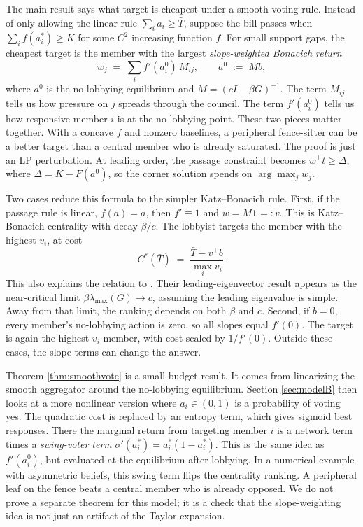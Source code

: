 \documentclass[11pt,letterpaper]{article}
\theoremstyle{plain}
\theoremstyle{definition}
\theoremstyle{remark}
\begin{document}
The main result says what target is cheapest under a smooth voting rule. Instead of only allowing the linear rule $\sum_i a_i \geq \bar T$, suppose the bill passes when $\sum_i f(a_i^*) \geq K$ for some $C^2$ increasing function $f$. For small support gaps, the cheapest target is the member with the largest \emph{slope-weighted Bonacich return}
\[
w_j \;=\; \sum_i f'(a_i^0)\, M_{ij}, \qquad a^0 \;:=\; M b,
\]
where $a^0$ is the no-lobbying equilibrium and $M = (cI - \beta G)^{-1}$. The term $M_{ij}$ tells us how pressure on $j$ spreads through the council. The term $f'(a_i^0)$ tells us how responsive member $i$ is at the no-lobbying point. These two pieces matter together. With a concave $f$ and nonzero baselines, a peripheral fence-sitter can be a better target than a central member who is already saturated. The proof is just an LP perturbation. At leading order, the passage constraint becomes $w^\top t \geq \Delta$, where $\Delta = K - F(a^0)$, so the corner solution spends on $\arg\max_j w_j$.

Two cases reduce this formula to the simpler Katz--Bonacich rule. First, if the passage rule is linear, $f(a) = a$, then $f' \equiv 1$ and $w = M\mathbf{1} =: v$. This is Katz--Bonacich centrality with decay $\beta/c$. The lobbyist targets the member with the highest $v_i$, at cost
\[
C^*(\bar T) \;=\; \frac{\bar T - v^\top b}{\max_i v_i}.
\]
This also explains the relation to \citet{ggg2020}. Their leading-eigenvector result appears as the near-critical limit $\beta \lambda_{\max}(G) \to c$, assuming the leading eigenvalue is simple. Away from that limit, the ranking depends on both $\beta$ and $c$. Second, if $b = 0$, every member's no-lobbying action is zero, so all slopes equal $f'(0)$. The target is again the highest-$v_i$ member, with cost scaled by $1/f'(0)$. Outside these cases, the slope terms can change the answer.

Theorem \ref{thm:smoothvote} is a small-budget result. It comes from linearizing the smooth aggregator around the no-lobbying equilibrium. Section \ref{sec:modelB} then looks at a more nonlinear version where $a_i \in (0,1)$ is a probability of voting yes. The quadratic cost is replaced by an entropy term, which gives sigmoid best responses. There the marginal return from targeting member $i$ is a network term times a \emph{swing-voter term} $\sigma'(a_i^*) = a_i^*(1-a_i^*)$. This is the same idea as $f'(a_i^0)$, but evaluated at the equilibrium after lobbying. In a numerical example with asymmetric beliefs, this swing term flips the centrality ranking. A peripheral leaf on the fence beats a central member who is already opposed. We do not prove a separate theorem for this model; it is a check that the slope-weighting idea is not just an artifact of the Taylor expansion.
\end{document}
